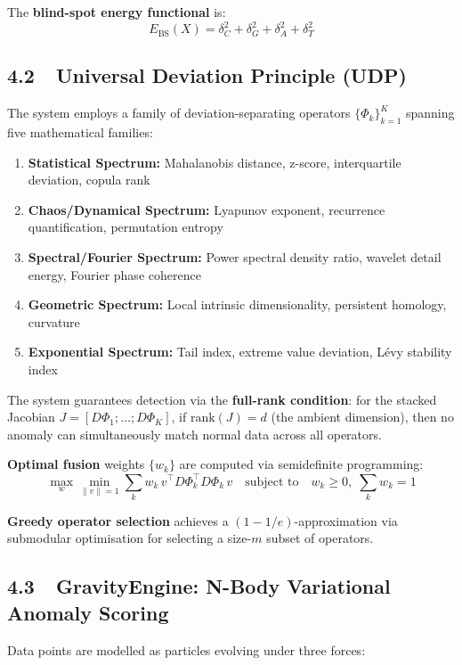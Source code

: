\documentclass[12pt,a4paper]{article}
\begin{document}
The \textbf{blind-spot energy functional} is:
\[
  E_{\mathrm{BS}}(X) = \delta_C^2 + \delta_G^2 + \delta_A^2 + \delta_T^2
\]

\subsection{4.2~~Universal Deviation Principle (UDP)}

The system employs a family of deviation-separating operators
$\{\Phi_k\}_{k=1}^K$ spanning five mathematical families:

\begin{enumerate}
\item \textbf{Statistical Spectrum:} Mahalanobis distance, z-score,
  interquartile deviation, copula rank
\item \textbf{Chaos/Dynamical Spectrum:} Lyapunov exponent, recurrence
  quantification, permutation entropy
\item \textbf{Spectral/Fourier Spectrum:} Power spectral density ratio,
  wavelet detail energy, Fourier phase coherence
\item \textbf{Geometric Spectrum:} Local intrinsic dimensionality, persistent
  homology, curvature
\item \textbf{Exponential Spectrum:} Tail index, extreme value deviation,
  L\'evy stability index
\end{enumerate}

The system guarantees detection via the \textbf{full-rank condition}: for the
stacked Jacobian $J = [D\Phi_1; \ldots; D\Phi_K]$, if $\mathrm{rank}(J) = d$
(the ambient dimension), then no anomaly can simultaneously match normal data
across all operators.

\textbf{Optimal fusion} weights $\{w_k\}$ are computed via semidefinite
programming:
\[
  \max_{w} \min_{\|v\|=1} \sum_k w_k \, v^\top D\Phi_k^\top D\Phi_k \, v
  \quad \text{subject to} \quad w_k \geq 0, \; \sum_k w_k = 1
\]

\textbf{Greedy operator selection} achieves a $(1 - 1/e)$-approximation via
submodular optimisation for selecting a size-$m$ subset of operators.

\subsection{4.3~~GravityEngine: N-Body Variational Anomaly Scoring}

Data points are modelled as particles evolving under three forces:
\end{document}
